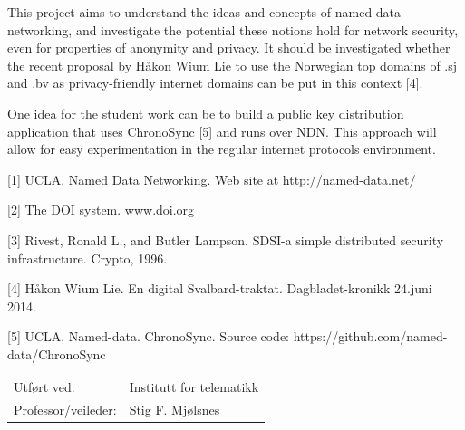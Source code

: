 \documentclass[a4paper,11pt]{article}
\begin{document}
\begin{titlepage}
This project aims to understand the ideas and concepts of named data networking, and investigate the
potential these notions hold for network security, even for properties of anonymity and privacy. 
It should be investigated whether the recent proposal by Håkon Wium Lie to use the Norwegian top domains of .sj and .bv as
privacy-friendly internet domains can be put in this context [4]. 

One idea for the student work can be to build a public key distribution application that uses ChronoSync [5] and runs over NDN.
This approach will allow for easy experimentation in the regular internet protocols environment.     

[1]  UCLA.  Named Data Networking. Web site at http://named-data.net/

[2]  The DOI system.  www.doi.org

[3]  Rivest, Ronald L., and Butler Lampson. SDSI-a simple distributed security infrastructure. Crypto, 1996.

[4]  Håkon Wium Lie.  En digital Svalbard-traktat. Dagbladet-kronikk 24.juni 2014.  

[5]  UCLA, Named-data. ChronoSync. Source code: https://github.com/named-data/ChronoSync

\begin{tabular}{@{}p{5cm}l}
Utf\o{}rt ved:	& Institutt for telematikk \\
Professor/veileder:	& Stig F. Mjølsnes \\
\end{tabular}

\end{titlepage}
\end{document}
